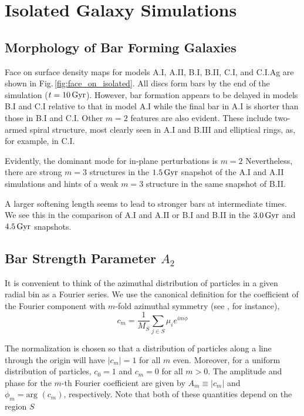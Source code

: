 \section{Isolated Galaxy Simulations}\label{sec:isolated}

\subsection{Morphology of Bar Forming Galaxies}

Face on surface density maps for models A.I, A.II, B.I, B.II, C.I, and
C.I.Ag are shown in Fig.\,\ref{fig:face_on_isolated}.  All discs form
bars by the end of the simulation ($t=10\,{\rm Gyr}$).  However, bar
formation appears to be delayed in models B.I and C.I relative to that
in model A.I while the final bar in A.I is shorter than those in B.I
and C.I.  Other $m=2$ features are also evident.  These include
two-armed spiral structure, most clearly seen in A.I and B.III and
elliptical rings, as, for example, in C.I.

Evidently, the dominant mode for in-plane perturbations is $m=2$
Nevertheless, there are strong $m=3$ structures in the $1.5\,{\rm
  Gyr}$ snapshot of the A.I and A.II simulations and hints of a weak
$m=3$ structure in the same snapshot of B.II.

A larger softening length seems to lead to stronger bars at
intermediate times.  We see this in the comparison of A.I and A.II or
B.I and B.II in the $3.0\,{\rm Gyr}$ and $4.5\,{\rm Gyr}$ snapshots.

\subsection{Bar Strength Parameter $A_2$}

It is convenient to think of the azimuthal distribution of particles
in a given radial bin as a Fourier series.  {We use the canonical definition for the coefficient
of the Fourier component with $m$-fold azimuthal symmetry (see \citet{debattista_sellwood_2000}, for instance),}
\begin{equation}\label{eq:cm}
c_m =  \frac{1}{M_S} \sum_{j \in S} \mu_i e^{i m \phi}
\end{equation}

The normalization is
chosen so that a distribution of particles along a line through the
origin will have $|c_m|=1$ for all $m$ even.  Moreover, for a uniform
distribution of particles, $c_0=1$ and $c_m=0$ for all $m>0$.  The
amplitude and phase for the $m$-th Fourier coefficient are given by
$A_m \equiv \vert c_m \vert$ and $\phi_m = \text{arg } (c_m)$,
respectively.  Note that both of these quantities depend on the region
$S$

